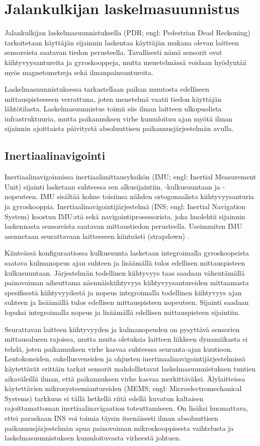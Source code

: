 \section{Jalankulkijan laskelmasuunnistus}

Jalankulkijan laskelmasuunnistuksella (PDR; engl: Pedestrian Dead Reckoning)
tarkoitetaan käyttäjän sijainnin laskentaa käyttäjän mukana olevan laitteen
sensoreista saatavan tiedon perusteella. Tavallisesti nämä sensorit ovat
kiihtyvyysantureita ja gyroskooppeja, mutta menetelmässä voidaan hyödyntää myös
magnetometreja sekä ilmanpaineantureita.

Laskelmasuunnistuksessa tarkastellaan paikan muutosta edelliseen
mittauspisteeseen verrattuna, joten menetelmä vaatii tiedon käyttäjän
lähtötilasta. Laskelmasuunnistus toimii siis ilman laitteen ulkopuolista
infrastruktuuria, mutta paikannuksen virhe kumuloituu ajan myötä ilman
sijainnin ajoittaista päivitystä absoluuttisen paikannusjärjestelmän
avulla.

\subsection{Inertiaalinavigointi}

Inertiaalinavigoinnissa inertiaalimittausyksikön (IMU; engl: Inertial
Measurement Unit) sijainti lasketaan suhteessa sen alkusijaintiin,
-kulkusuuntaan ja -nopeuteen. IMU sisältää kolme toisiinsa nähden
ortogonaalista kiihtyvyysanturia ja gyroskooppia.
Inertiaalinavigointijärjestelmä (INS; engl: Inertial Navigation System) koostuu
IMU:stä sekä navigointiprosessorista, joka huolehtii sijainnin laskennasta
sensoreista saatavan mittaustiedon perusteella. Useimmiten IMU asennetaan
seurattavaan laitteeseen kiinteästi (strapdown) \cite{harle2013}.

Kiinteässä konfiguraatiossa kulkusuunta lasketaan
integroimalla gyroskoopeista saatava kulmanopeus ajan suhteen ja lisäämällä
tulos edellisen mittauspisteen kulkusuuntaan. Järjestelmän todellinen
kiihtyvyys taas saadaan vähentämällä painovoiman aiheuttama näennäiskiihtyvyys
kiihtyvyysantureiden mittaamasta spesifisestä kiihtyvyydestä ja nopeus
integroimalla todellinen kiihtyvyys ajan suhteen ja lisäämällä tulos edellisen
mittauspisteen nopeuteen. Sijainti saadaan lopuksi integroimalla nopeus ja
lisäämällä edellisen mittauspisteen sijaintiin.

Seurattavan laitteen kiihtyvyyden ja kulmanopeuden on pysyttävä sensorien
mittausalueen rajoissa, mutta muita oletuksia laitteen liikkeen dynamiikasta ei
tehdä, joten paikannuksen virhe kasvaa suhteessa seuranta-ajan kuutioon.
Lentokoneiden, sukellusveneiden ja ohjusten inertinaalinavigointijärjestelmissä
käytettävät erittäin tarkat sensorit mahdollistavat laskelmasuunnistuksen
tuntien aikaväleillä ilman, että paikannuksen virhe kasvaa merkittäväksi.
Älylaitteissa käytettävien mikrosysteemiantureiden (MEMS; engl:
Microelectromechanical Systems) tarkkuus ei tällä hetkellä riitä edellä kuvatun
kaltaisen rajoittamattoman inertiaalinavigaation toteuttamiseen. On lisäksi
huomattava, ettei paraskaan INS voi toimia täysin itsenäisesti ilman
absoluuttisen paikannusjärjestelmän apua painovoiman mikroskooppisesta
vaihtelusta ja laskelmasuunnistuksen kumuloituvasta virheestä johtuen.

